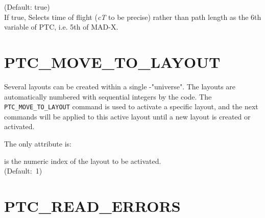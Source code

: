 \begin{madlist}
	 (Default: true)\\  
	If true, Selects time of flight (\textit{cT} to be precise) rather
	than path length as the 6th variable of PTC, i.e. 5th of MAD-X.     
	
\end{madlist}


\section{PTC\_MOVE\_TO\_LAYOUT}
\label{sec:ptc-move-to-layout}

Several \ptc layouts can be created within a single \ptc-"universe". 
The layouts are automatically numbered with sequential integers by the 
\madx code. The \texttt{PTC\_MOVE\_TO\_LAYOUT} command is used to
activate a specific layout, and the next \ptc commands will be
applied to this active \ptc layout until a new \ptc layout is created
or activated. 


The only attribute is:
\begin{madlist}
	 is the numeric index of the \ptc layout to be
	activated.\\ (Default:~1)
\end{madlist}

\section{PTC\_READ\_ERRORS}
\label{sec:ptc-read-errors}

